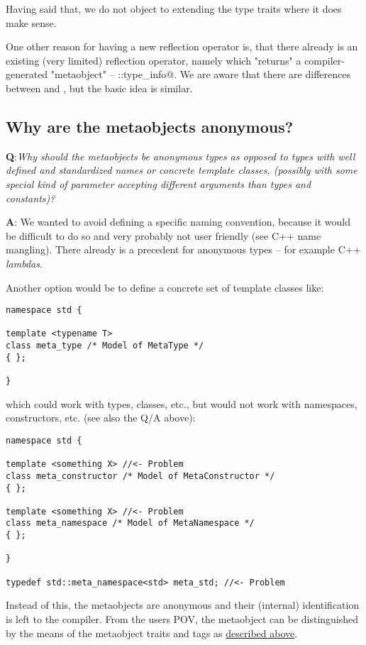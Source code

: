 Having said that, we do not object to extending the type traits where it does make sense.

One other reason for having a new reflection operator is, that there already is an
existing (very limited) reflection operator, namely \verb@typeid@ which "returns"
a compiler-generated "metaobject" -- \verb@std::type_info@. We are aware that there
are differences between \verb@typeid@ and \verb@mirrored@, but the basic idea is similar.

\subsection{Why are the metaobjects anonymous?}

{\textbf Q:}{\em Why should the metaobjects be anonymous types as opposed to
types with well defined and standardized names or concrete template classes, (possibly with some
special kind of parameter accepting different arguments than types and constants)?}

{\textbf A:} We wanted to avoid defining a specific naming convention, because it would
be difficult to do so and very probably not user friendly (see C++ name mangling). There
already is a precedent for anonymous types -- for example C++ {\em lambdas}.

Another option would be to define a concrete set of template classes like:

\begin{verbatim}
namespace std {

template <typename T>
class meta_type /* Model of MetaType */
{ };

}
\end{verbatim}

which could work with types, classes, etc., but would not work with namespaces, constructors,
etc. (see also the Q/A above):

\begin{verbatim}
namespace std {

template <something X> //<- Problem
class meta_constructor /* Model of MetaConstructor */
{ };

template <something X> //<- Problem
class meta_namespace /* Model of MetaNamespace */
{ };

}

typedef std::meta_namespace<std> meta_std; //<- Problem
\end{verbatim}

Instead of this, the metaobjects are anonymous and their (internal) identification
is left to the compiler. From the users POV, the metaobject can be distinguished
by the means of the metaobject traits and tags as \hyperref[section-Concepts]{described above}.
